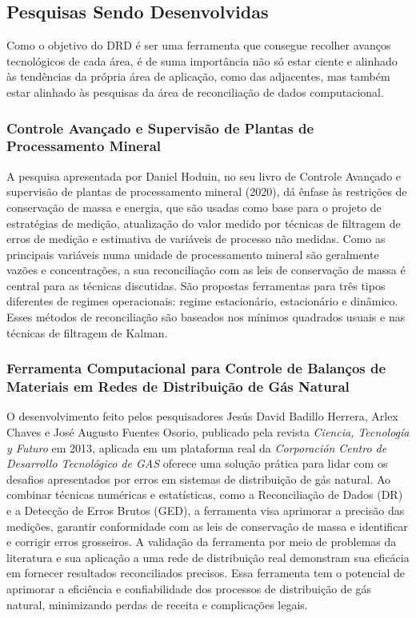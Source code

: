 \subsection{Pesquisas Sendo Desenvolvidas}

Como o objetivo do DRD é ser uma ferramenta que consegue recolher avanços tecnológicos de cada área, é de suma importância não só estar ciente e alinhado às tendências da própria área de aplicação, como das adjacentes, mas também estar alinhado às pesquisas da área de reconciliação de dados computacional. 

\subsubsection{Controle Avançado e Supervisão de Plantas de Processamento Mineral}

A pesquisa apresentada por Daniel Hoduin, no seu livro de Controle Avançado e supervisão de plantas de processamento mineral (2020), dá  ênfase às restrições de conservação de massa e energia, que são usadas como base para o projeto de estratégias de medição, atualização do valor medido por técnicas de filtragem de erros de medição e estimativa de variáveis de processo não medidas. Como as principais variáveis numa unidade de processamento mineral são geralmente vazões e concentrações, a sua reconciliação com as leis de conservação de massa é central para as técnicas discutidas. São propostas ferramentas para três tipos diferentes de regimes operacionais: regime estacionário, estacionário e dinâmico. Esses métodos de reconciliação são baseados nos mínimos quadrados usuais e nas técnicas de filtragem de Kalman.

\subsubsection{Ferramenta Computacional para Controle de Balanços de Materiais em Redes de Distribuição de Gás Natural}

O desenvolvimento feito pelos pesquisadores Jesús David Badillo Herrera, Arlex Chaves e José Augusto Fuentes Osorio, publicado pela revista \textit{Ciencia, Tecnología y Futuro} em 2013, aplicada em um plataforma real da \textit{Corporación Centro de Desarrollo Tecnológico de GAS} oferece uma solução prática para lidar com os desafios apresentados por erros em sistemas de distribuição de gás natural. Ao combinar técnicas numéricas e estatísticas, como a Reconciliação de Dados (DR) e a Detecção de Erros Brutos (GED), a ferramenta visa aprimorar a precisão das medições, garantir conformidade com as leis de conservação de massa e identificar e corrigir erros grosseiros. A validação da ferramenta por meio de problemas da literatura e sua aplicação a uma rede de distribuição real demonstram sua eficácia em fornecer resultados reconciliados precisos. Essa ferramenta tem o potencial de aprimorar a eficiência e confiabilidade dos processos de distribuição de gás natural, minimizando perdas de receita e complicações legais.

